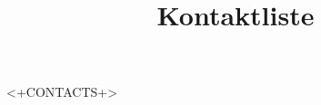 \documentclass{ucph-revy}
\title{Kontaktliste}
\begin{document}
\maketitle

<+CONTACTS+>
\end{document}
